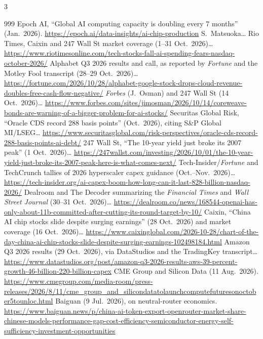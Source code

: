 \begin{multicols}{3}
\begin{thebibliography}{999}
 Epoch AI, ``Global AI computing capacity is doubling every 7 months'' (Jan.\ 2026). \url{https://epoch.ai/data-insights/ai-chip-production}
 S.~Matsuoka…
 Rio Times, Caixin and 247 Wall St market coverage (1--31 Oct.\ 2026)… \url{https://www.riotimesonline.com/tech-stocks-fall-ai-spending-fears-nasdaq-october-2026/}
 Alphabet Q3 2026 results and call, as reported by \emph{Fortune} and the Motley Fool transcript (28--29 Oct.\ 2026)… \url{https://fortune.com/2026/10/28/alphabet-google-stock-drops-cloud-revenue-doubles-free-cash-flow-negative/}
 \emph{Forbes} (J.~Osman) and 247 Wall St (14 Oct.\ 2026)… \url{https://www.forbes.com/sites/jimosman/2026/10/14/coreweave-bonds-are-warning-of-a-bigger-problem-for-ai-stocks/}
 Securitas Global Risk, ``Oracle CDS record 288 basis points'' (Oct.\ 2026), citing S\&P Global MI/LSEG… \url{https://www.securitasglobal.com/risk-perspectives/oracle-cds-record-288-basis-points-ai-debt/}
 247 Wall St, ``The 10-year yield just broke its 2007 peak'' (1 Oct.\ 2026)… \url{https://247wallst.com/investing/2026/10/01/the-10-year-yield-just-broke-its-2007-peak-here-is-what-comes-next/}
 Tech-Insider/\emph{Fortune} and TechCrunch tallies of 2026 hyperscaler capex guidance (Oct.--Nov.\ 2026)… \url{https://tech-insider.org/ai-capex-boom-how-long-can-it-last-828-billion-nasdaq-2026/}
 Dealroom and The Decoder summarizing the \emph{Financial Times} and \emph{Wall Street Journal} (30--31 Oct.\ 2026)… \url{https://dealroom.co/news/168544-openai-has-only-about-11b-committed-after-cutting-its-round-target-by-10/}
 Caixin, ``China AI chip stocks slide despite surging earnings'' (28 Oct.\ 2026) and market coverage (16 Oct.\ 2026)… \url{https://www.caixinglobal.com/2026-10-28/chart-of-the-day-china-ai-chip-stocks-slide-despite-surging-earnings-102498184.html}
 Amazon Q3 2026 results (29 Oct.\ 2026), via DataStudios and the TradingKey transcript… \url{https://www.datastudios.org/post/amazon-q3-2026-results-aws-39-percent-growth-46-billion-220-billion-capex}
 CME Group and Silicon Data (11 Aug.\ 2026). \url{https://www.cmegroup.com/media-room/press-releases/2026/8/11/cme_group_and_silicondatatolaunchcomputefuturesonoctober5tounloc.html}
 Baiguan (9 Jul.\ 2026), on neutral-router economics. \url{https://www.baiguan.news/p/china-ai-token-export-openrouter-market-share-chinese-models-performance-gap-cost-efficiency-semiconductor-energy-self-sufficiency-investment-opportunities}

\end{thebibliography}
\end{multicols}
